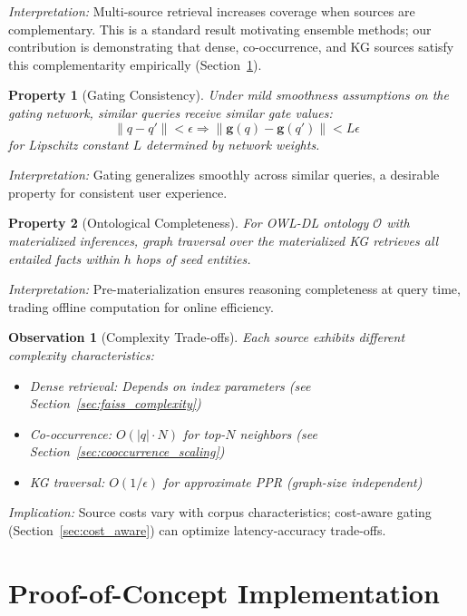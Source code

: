 \documentclass[11pt,a4paper]{article}
\newtheorem{property}{Property}
\newtheorem{observation}{Observation}
\begin{document}
\textit{Interpretation:} Multi-source retrieval increases coverage when sources are complementary. This is a standard result motivating ensemble methods; our contribution is demonstrating that dense, co-occurrence, and KG sources satisfy this complementarity empirically (Section~\ref{sec:poc}).

\begin{property}[Gating Consistency]
\label{prop:gating}
Under mild smoothness assumptions on the gating network, similar queries receive similar gate values:
\begin{equation}
\|q - q'\| < \epsilon \Rightarrow \|\mathbf{g}(q) - \mathbf{g}(q')\| < L\epsilon
\end{equation}
for Lipschitz constant $L$ determined by network weights.
\end{property}

\textit{Interpretation:} Gating generalizes smoothly across similar queries, a desirable property for consistent user experience.

\begin{property}[Ontological Completeness]
\label{prop:owl}
For OWL-DL ontology $\mathcal{O}$ with materialized inferences, graph traversal over the materialized KG retrieves all entailed facts within $h$ hops of seed entities.
\end{property}

\textit{Interpretation:} Pre-materialization ensures reasoning completeness at query time, trading offline computation for online efficiency.

\begin{observation}[Complexity Trade-offs]
\label{obs:complexity}
Each source exhibits different complexity characteristics:
\begin{itemize}
    \item Dense retrieval: Depends on index parameters (see Section~\ref{sec:faiss_complexity})
    \item Co-occurrence: $O(|q| \cdot N)$ for top-$N$ neighbors (see Section~\ref{sec:cooccurrence_scaling})
    \item KG traversal: $O(1/\epsilon)$ for approximate PPR (graph-size independent)
\end{itemize}
\end{observation}

\textit{Implication:} Source costs vary with corpus characteristics; cost-aware gating (Section~\ref{sec:cost_aware}) can optimize latency-accuracy trade-offs.

\section{Proof-of-Concept Implementation}
\label{sec:poc}
\end{document}
